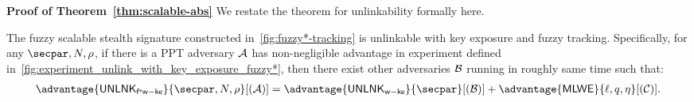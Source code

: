 \noindent\textbf{Proof of Theorem~\ref{thm:scalable-abs}}
We restate the theorem for unlinkability formally here.
\begin{theorem}
\label{thm:scalable-unlink}
The fuzzy scalable stealth signature constructed in~\cref{fig:fuzzy*-tracking} is unlinkable with key exposure and fuzzy tracking. Specifically, for any $\secpar, N,\rho$, if there is a PPT adversary $\mathcal{A}$ has non-negligible advantage in experiment defined in~\cref{fig:experiment_unlink_with_key_exposure_fuzzy*}, then there exist other adversaries $\mathcal{B}$ running in roughly same time such that:
\begin{align*}
  \advantage{\unlinkfswke}{\secpar,N,\rho}[(\Ac)]  = \advantage{\unlinkwke}{\secpar}[(\Bc)] + \advantage{\mlwe}{\ell,q,\eta}[(\Cc)].
\end{align*}
\end{theorem}
